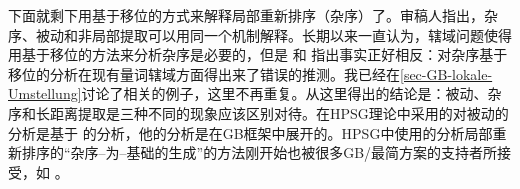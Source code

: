 
下面就剩下用基于移位的方式来解释局部重新排序（杂序）了。审稿人指出，杂序、被动和非局部提取可以用同一个机制解释。长期以来一直认为，辖域问题使得用基于移位的方法来分析杂序是必要的，但是 和 指出事实正好相反：对杂序基于移位的分析在现有量词辖域方面得出来了错误的推测。我已经在\ref{sec-GB-lokale-Umstellung}讨论了相关的例子，这里不再重复。从这里得出的结论是：被动、杂序和长距离提取是三种不同的现象应该区别对待。在HPSG理论中采用的对被动的分析是基于 \citet{Haider86}的分析，他的分析是在GB框架中展开的。HPSG中使用的分析局部重新排序的“杂序--为--基础的生成”的方法刚开始也被很多GB/最简方案的支持者所接受，如 \citet{Fanselow2001a}。

